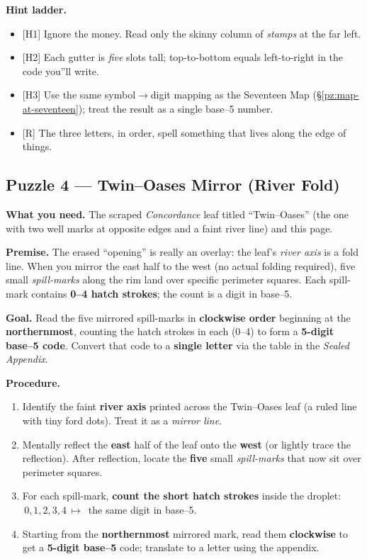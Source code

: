 \documentclass[11pt]{article}
\numberwithin{equation}{section} %
\theoremstyle{plain} %
\theoremstyle{definition} %
\theoremstyle{remark} %
\begin{document}
\medskip
\noindent\textbf{Hint ladder.}
\begin{itemize}\setlength\itemsep{0.25em}
  \item \textsc{[H1]} Ignore the money. Read only the skinny column of \emph{stamps} at the far left.
  \item \textsc{[H2]} Each gutter is \emph{five} slots tall; top-to-bottom equals left-to-right in the code you''ll write.
  \item \textsc{[H3]} Use the same symbol\(\rightarrow\)digit mapping as the Seventeen Map (\S\ref{pz:map-at-seventeen}); treat the result as a single base--5 number.
  \item \textsc{[R]} The three letters, in order, spell something that lives along the edge of things.
\end{itemize}

\subsection{Puzzle 4 --- Twin--Oases Mirror (River Fold)}
\label{pz:twin-oases}

\noindent\textbf{What you need.} The scraped \emph{Concordance} leaf titled ``Twin--Oases'' (the one with two well marks at opposite edges and a faint river line) and this page.

\medskip
\noindent\textbf{Premise.} The erased ``opening'' is really an overlay: the leaf's \emph{river axis} is a fold line. When you mirror the east half to the west (no actual folding required), five small \emph{spill-marks} along the rim land over specific perimeter squares. Each spill-mark contains \textbf{0--4 hatch strokes}; the count is a digit in base--5.

\medskip
\noindent\textbf{Goal.} Read the five mirrored spill-marks in \textbf{clockwise order} beginning at the \textbf{northernmost}, counting the hatch strokes in each (0--4) to form a \textbf{5-digit base--5 code}. Convert that code to a \textbf{single letter} via the table in the \emph{Sealed Appendix}.

\medskip
\noindent\textbf{Procedure.}
\begin{enumerate}\setlength\itemsep{0.2em}
  \item Identify the faint \textbf{river axis} printed across the Twin--Oases leaf (a ruled line with tiny ford dots). Treat it as a \emph{mirror line}.
  \item Mentally reflect the \textbf{east} half of the leaf onto the \textbf{west} (or lightly trace the reflection). After reflection, locate the \textbf{five} small \emph{spill-marks} that now sit over perimeter squares.
  \item For each spill-mark, \textbf{count the short hatch strokes} inside the droplet: \(\,0,1,2,3,4\,\mapsto\,\) the same digit in base--5.
  \item Starting from the \textbf{northernmost} mirrored mark, read them \textbf{clockwise} to get a \textbf{5-digit base--5} code; translate to a letter using the appendix.
\end{enumerate}
\end{document}
